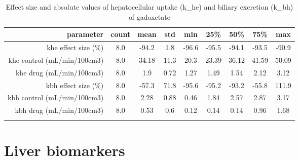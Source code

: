 \documentclass{epflreport}%
\begin{document}
%
\begin{longtable}{rcccccccc}%
\hline%
parameter&count&mean&std&min&25\%&50\%&75\%&max\\%
\hline%
khe effect size (\%)&8.0&{-}94.2&1.8&{-}96.6&{-}95.5&{-}94.1&{-}93.5&{-}90.9\\%
khe control (mL/min/100cm3)&8.0&34.18&11.3&20.3&23.39&36.12&41.59&50.09\\%
khe drug (mL/min/100cm3)&8.0&1.9&0.72&1.27&1.49&1.54&2.12&3.12\\%
kbh effect size (\%)&8.0&{-}57.3&71.8&{-}95.6&{-}95.2&{-}93.2&{-}55.8&111.9\\%
kbh control (mL/min/100cm3)&8.0&2.28&0.88&0.46&1.84&2.57&2.87&3.17\\%
kbh drug (mL/min/100cm3)&8.0&0.53&0.6&0.12&0.14&0.14&0.96&1.68\\%
\hline%
\caption{Effect size and absolute values of hepatocellular uptake (k\_he) and biliary excretion (k\_bh) of gadoxetate} \\%
\end{longtable}%
\clearpage%
\section{Liver biomarkers}%
\label{sec:Liverbiomarkers}%
\end{document}
